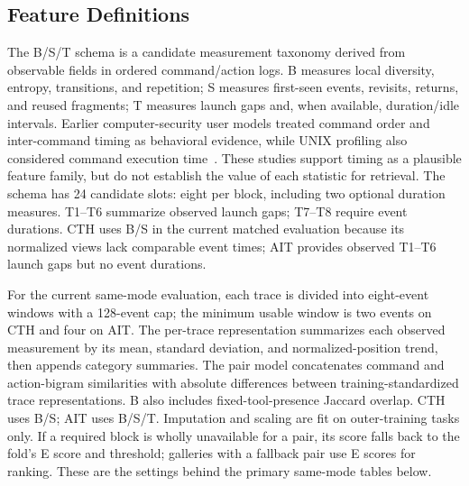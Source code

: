 \documentclass[10pt]{article}
\begin{document}
\subsection{Feature Definitions}
The B/S/T schema is a candidate measurement taxonomy derived from observable fields in ordered command/action logs. B measures local diversity, entropy, transitions, and repetition; S measures first-seen events, revisits, returns, and reused fragments; T measures launch gaps and, when available, duration/idle intervals. Earlier computer-security user models treated command order and inter-command timing as behavioral evidence, while UNIX profiling also considered command execution time~\cite{mcmahon,dao}. These studies support timing as a plausible feature family, but do not establish the value of each statistic for retrieval. The schema has 24 candidate slots: eight per block, including two optional duration measures. T1--T6 summarize observed launch gaps; T7--T8 require event durations. CTH uses B/S in the current matched evaluation because its normalized views lack comparable event times; AIT provides observed T1--T6 launch gaps but no event durations.

For the current same-mode evaluation, each trace is divided into eight-event windows with a 128-event cap; the minimum usable window is two events on CTH and four on AIT. The per-trace representation summarizes each observed measurement by its mean, standard deviation, and normalized-position trend, then appends category summaries. The pair model concatenates command and action-bigram similarities with absolute differences between training-standardized trace representations. B also includes fixed-tool-presence Jaccard overlap. CTH uses B/S; AIT uses B/S/T. Imputation and scaling are fit on outer-training tasks only. If a required block is wholly unavailable for a pair, its score falls back to the fold's E score and threshold; galleries with a fallback pair use E scores for ranking. These are the settings behind the primary same-mode tables below.
\end{document}
